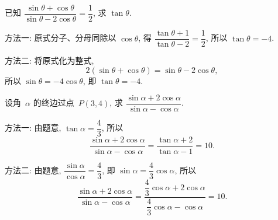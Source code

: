 \begin{example}
    已知 $\dfrac{\sin\theta+ \cos\theta}{\sin\theta- 2\cos\theta}= \dfrac12$, 求 $\tan\theta$.
\end{example}
\begin{solution}
    方法一: 原式分子、分母同除以 $\cos\theta$, 得 $\dfrac{\tan\theta+ 1}{\tan\theta- 2}= \dfrac12$, 所以 $\tan\theta= -4$.
    
    方法二: 将原式化为整式, 
    \[2(\sin\theta+ \cos\theta)=\sin\theta- 2\cos\theta,\]
    所以 $\sin\theta= -4\cos\theta$, 即 $\tan\theta= -4$.
\end{solution}

\begin{example}
    设角~$\alpha$ 的终边过点~$P(3,4)$, 求 $\dfrac{\sin\alpha+ 2\cos\alpha}{\sin\alpha- \cos\alpha}$.
\end{example}
\begin{solution}
    方法一: 由题意, $\tan\alpha= \dfrac43$, 所以
    \[\frac{\sin\alpha+ 2\cos\alpha}{\sin\alpha- \cos\alpha}
        = \frac{\tan\alpha+ 2}{\tan\alpha- 1}
        = 10.\]
    
    方法二: 由题意, $\dfrac{\sin\alpha}{\cos\alpha}= \dfrac43$, 即 $\sin\alpha= \dfrac43\cos\alpha$, 所以
    \[\frac{\sin\alpha+ 2\cos\alpha}{\sin\alpha- \cos\alpha}
        = \frac{\dfrac43\cos\alpha+ 2\cos\alpha}{\dfrac43\cos\alpha- \cos\alpha}
        = 10.\]
\end{solution}